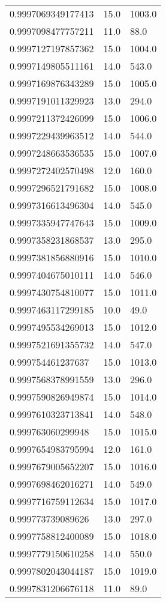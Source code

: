 \begin{center}
\begin{supertabular}[H]{p{0.30\textwidth}p{0.05\textwidth}p{0.05\textwidth}}
0.9997069349177413 & 15.0 & 1003.0 \\ 
0.9997098477757211 & 11.0 & 88.0 \\ 
0.9997127197857362 & 15.0 & 1004.0 \\ 
0.9997149805511161 & 14.0 & 543.0 \\ 
0.9997169876343289 & 15.0 & 1005.0 \\ 
0.9997191011329923 & 13.0 & 294.0 \\ 
0.9997211372426099 & 15.0 & 1006.0 \\ 
0.9997229439963512 & 14.0 & 544.0 \\ 
0.9997248663536535 & 15.0 & 1007.0 \\ 
0.9997272402570498 & 12.0 & 160.0 \\ 
0.9997296521791682 & 15.0 & 1008.0 \\ 
0.9997316613496304 & 14.0 & 545.0 \\ 
0.9997335947747643 & 15.0 & 1009.0 \\ 
0.9997358231868537 & 13.0 & 295.0 \\ 
0.9997381856880916 & 15.0 & 1010.0 \\ 
0.9997404675010111 & 14.0 & 546.0 \\ 
0.9997430754810077 & 15.0 & 1011.0 \\ 
0.9997463117299185 & 10.0 & 49.0 \\ 
0.9997495534269013 & 15.0 & 1012.0 \\ 
0.9997521691355732 & 14.0 & 547.0 \\ 
0.999754461237637 & 15.0 & 1013.0 \\ 
0.9997568378991559 & 13.0 & 296.0 \\ 
0.9997590826949874 & 15.0 & 1014.0 \\ 
0.9997610323713841 & 14.0 & 548.0 \\ 
0.999763060299948 & 15.0 & 1015.0 \\ 
0.9997654983795994 & 12.0 & 161.0 \\ 
0.9997679005652207 & 15.0 & 1016.0 \\ 
0.9997698462016271 & 14.0 & 549.0 \\ 
0.9997716759112634 & 15.0 & 1017.0 \\ 
0.999773739089626 & 13.0 & 297.0 \\ 
0.9997758812400089 & 15.0 & 1018.0 \\ 
0.9997779150610258 & 14.0 & 550.0 \\ 
0.9997802043044187 & 15.0 & 1019.0 \\ 
0.9997831206676118 & 11.0 & 89.0 \\ 

\end{supertabular}
\end{center}

